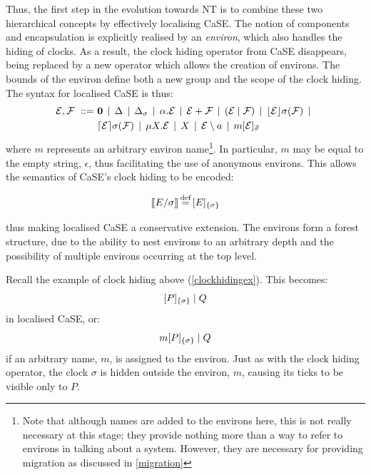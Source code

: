 Thus, the first step in the evolution towards NT is to combine these
two hierarchical concepts by effectively localising CaSE.  The notion of
components and encapsulation is explicitly realised by an
\emph{environ}, which also handles the hiding of clocks.  As a result,
the clock hiding operator from CaSE disappears, being replaced by a new
operator which allows the creation of environs.  The bounds of the
environ define both a new group and the scope of the clock hiding.  The
syntax for localised CaSE is thus:
\begin{equation}
  \begin{aligned}
    \text{$\mathcal{E}$}, \text{$\mathcal{F}$}\ ::=\ &
    \textbf{0}  \;\,|\,\; 
    \Delta \;\,|\,\; 
    \Delta_{\sigma} \;\,|\,\; 
    \alpha . \text{$\mathcal{E}$}  \;\,|\,\;
    \text{$\mathcal{E}$} + \text{$\mathcal{F}$} \;\,|\,\; 
    (\text{$\mathcal{E}$}\;|\;\text{$\mathcal{F}$})\;\,|\,\; 
    \lfloor{\text{$\mathcal{E}$}}\rfloor {\sigma} ({\text{$\mathcal{F}$}}) \;\,|\,\; \\
    & \lceil{\text{$\mathcal{E}$}}\rceil {\sigma} ({\text{$\mathcal{F}$}}) \;\,|\,\; 
    \mu X . \text{$\mathcal{E}$} \;\,|\,\; 
    X \;\,|\,\; 
    \text{$\mathcal{E}$} \setminus a \;\,|\,\; 
    {m}[ \text{$\mathcal{E}$} ]_{\vec{\sigma}}
  \end{aligned}
\end{equation}
where $m$ represents an arbitrary environ name\footnote{Note
that although names are added to the environs here, this is not really
necessary at this stage; they provide nothing more than a way to refer
to environs in talking about a system.  However, they are necessary
for providing migration as discussed in \ref{migration}}.  In
particular, $m$ may be equal to the empty string, $\epsilon$, thus
facilitating the use of anonymous environs.  This allows the semantics
of CaSE's clock hiding to be encoded:

\begin{equation}
[\hspace{-0.3ex}[ E / \sigma ]\hspace{-0.3ex}] \operatorname{\stackrel{\textrm{def}}{=}} {}[ E ]_{\{\sigma\}}
\end{equation}

\noindent thus making localised CaSE a conservative extension.  The
environs form a forest structure, due to the ability to nest
environs to an arbitrary depth and the possibility of multiple
environs occurring at the top level.

Recall the example of clock hiding above (\ref{clockhidingex}).  This
becomes:
\begin{equation}
  {}[ P ]_{\{\sigma\}}\;|\;Q
\end{equation}
in localised CaSE, or:
\begin{equation}
  {m}[ P ]_{\{\sigma\}}\;|\;Q
\end{equation}
if an arbitrary name, $m$, is assigned to the environ.  Just
as with the clock hiding operator, the clock $\sigma$ is hidden outside
the environ, $m$, causing its ticks to be visible only to $P$.  

